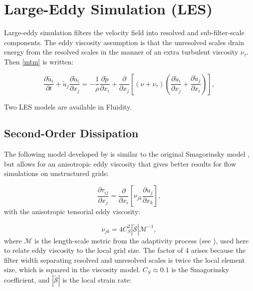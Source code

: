 \section{Large-Eddy Simulation (LES)}

Large-eddy simulation filters the velocity field into resolved and sub-filter-scale components. The eddy viscosity assumption is that the unresolved scales drain energy from the resolved scales in the manner of an extra turbulent viscosity $\nu_\tau$. Then \eqref{mtm} is written:

\begin{equation}
\frac{\partial \tilde u_i}{\partial t} + \tilde u_j \frac{\partial \tilde u_i}{\partial x_j}
 = -\frac 1 \rho \frac{\partial \tilde p}{\partial x_i}
 + \frac{\partial}{\partial x_j} \left [ (\nu + \nu_\tau) \left ( \frac{\partial \tilde u_i}{\partial x_j} + \frac{\partial \tilde u_j}{\partial x_i} \right ) \right ],
\end{equation}

Two LES models are available in Fluidity.

\subsection{Second-Order Dissipation}

The following model developed by \citet{bentham2003} is similar to the original Smagorinsky model \citep{smagorinsky1963general}, but allows for an anisotropic eddy viscosity that gives better results for flow simulations on unstructured grids:

\begin{equation}
\frac{\partial \tau_{ij}}{\partial x_j} = \frac{\partial}{\partial x_i} \left [ \nu_{jk}\frac{\partial u_j}{\partial x_k} \right ],
\end{equation}
with the anisotropic tensorial eddy viscosity:

\begin{equation}
\nu_{jk} = 4C_S^2 \left | \mathcal{\tilde S} \right | \mathcal{M}^{-1},
\end{equation}
where $\mathcal{M}$ is the length-scale metric from the adaptivity process (see \citet{pain2001}), used here to relate eddy viscosity to the local grid size. The factor of 4 arises because the filter width separating resolved and unresolved scales is twice the local element size, which is squared in the viscosity model. $C_S \approx 0.1$ is the Smagorinsky coefficient, and $\left | \mathcal{\tilde S} \right |$ is the local strain rate:

